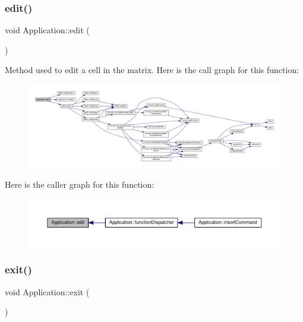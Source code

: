 \subsubsection{\texorpdfstring{edit()}{edit()}}
{\footnotesize\ttfamily void Application\+::edit (\begin{DoxyParamCaption}{ }\end{DoxyParamCaption})\hspace{0.3cm}{\ttfamily [private]}}

Method used to edit a cell in the matrix. Here is the call graph for this function\+:
\nopagebreak
\begin{figure}[H]
\begin{center}
\leavevmode
\includegraphics[width=350pt]{class_application_a4b193bf9c8be7105e89a2323ea77b1f4_cgraph}
\end{center}
\end{figure}
Here is the caller graph for this function\+:\nopagebreak
\begin{figure}[H]
\begin{center}
\leavevmode
\includegraphics[width=350pt]{class_application_a4b193bf9c8be7105e89a2323ea77b1f4_icgraph}
\end{center}
\end{figure}
\mbox{\label{class_application_a3c8a98d6c10a5b054800488df16cdbcb}} 
\subsubsection{\texorpdfstring{exit()}{exit()}}
{\footnotesize\ttfamily void Application\+::exit (\begin{DoxyParamCaption}{ }\end{DoxyParamCaption})\hspace{0.3cm}{\ttfamily [private]}}

